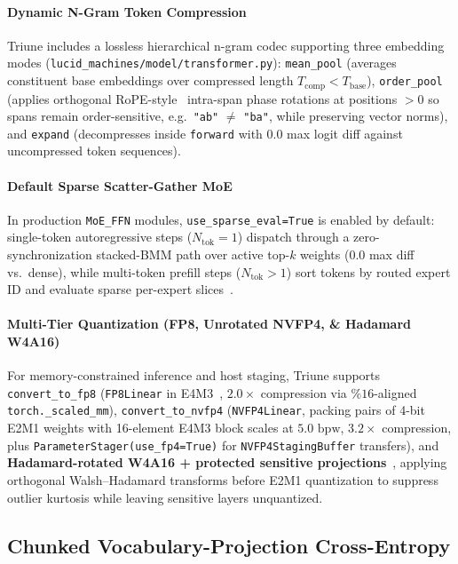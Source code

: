 \documentclass[10pt,twocolumn,letterpaper]{article}
\begin{document}
\paragraph{Dynamic N-Gram Token Compression} Triune includes a lossless hierarchical n-gram codec supporting three embedding modes (\texttt{lucid\_machines/model/transformer.py}): \texttt{mean\_pool} (averages constituent base embeddings over compressed length $T_{\text{comp}} < T_{\text{base}}$), \texttt{order\_pool} (applies orthogonal RoPE-style~\cite{su2024roformer} intra-span phase rotations at positions $>0$ so spans remain order-sensitive, e.g.\ \texttt{"ab"} $\neq$ \texttt{"ba"}, while preserving vector norms), and \texttt{expand} (decompresses inside \texttt{forward} with $0.0$ max logit diff against uncompressed token sequences).

\paragraph{Default Sparse Scatter-Gather MoE} In production \texttt{MoE\_FFN} modules, \texttt{use\_sparse\_eval=True} is enabled by default: single-token autoregressive steps ($N_{\text{tok}}=1$) dispatch through a zero-synchronization stacked-BMM path over active top-$k$ weights ($0.0$ max diff vs.\ dense), while multi-token prefill steps ($N_{\text{tok}}>1$) sort tokens by routed expert ID and evaluate sparse per-expert slices~\cite{shazeer2017outrageously,fedus2022switch,gale2023megablocks}.

\paragraph{Multi-Tier Quantization (FP8, Unrotated NVFP4, \& Hadamard W4A16)} For memory-constrained inference and host staging, Triune supports \texttt{convert\_to\_fp8} (\texttt{FP8Linear} in E4M3~\cite{micikevicius2022fp8}, $2.0\times$ compression via $\%16$-aligned \texttt{torch.\_scaled\_mm}), \texttt{convert\_to\_nvfp4} (\texttt{NVFP4Linear}, packing pairs of 4-bit E2M1 weights with 16-element E4M3 block scales at $5.0\text{ bpw}$, $3.2\times$ compression, plus \texttt{ParameterStager(use\_fp4=True)} for \texttt{NVFP4StagingBuffer} transfers), and \textbf{Hadamard-rotated W4A16 + protected sensitive projections}~\cite{liu2024spinquant,ashkboos2024quarot}, applying orthogonal Walsh--Hadamard transforms before E2M1 quantization to suppress outlier kurtosis while leaving sensitive layers unquantized.

\subsection{Chunked Vocabulary-Projection Cross-Entropy}
\end{document}

